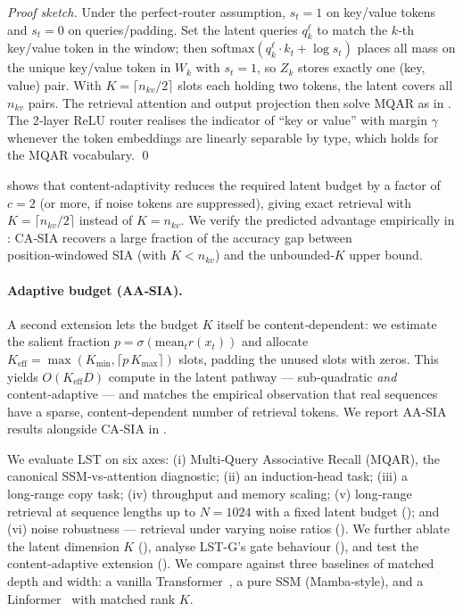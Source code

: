 \documentclass[10pt,twocolumn,letterpaper]{article}
\newcommand{\LST}{\textsc{LST}}
\newcommand{\SIA}{\textsc{SIA}}
\begin{document}
\begin{proof}[Proof sketch]
Under the perfect‑router assumption, $s_t\!=\!1$ on key/value tokens and
$s_t\!=\!0$ on queries/padding.  Set the latent queries $q_k^\ell$ to
match the $k$‑th key/value token in the window; then
$\mathrm{softmax}(q_k^\ell\!\cdot\!k_t + \log s_t)$ places all mass on
the unique key/value token in $W_k$ with $s_t\!=\!1$, so $Z_k$ stores
exactly one (key, value) pair.  With $K\!=\!\lceil n_{kv}/2\rceil$ slots
each holding two tokens, the latent covers all $n_{kv}$ pairs.  The
retrieval attention and output projection then solve MQAR as in
.  The 2‑layer ReLU router realises the indicator of
``key or value'' with margin $\gamma$ whenever the token embeddings are
linearly separable by type, which holds for the MQAR vocabulary.  \qed
\end{proof}

 shows that content‑adaptivity reduces the required
latent budget by a factor of $c\!=\!2$ (or more, if noise tokens are
suppressed), giving exact retrieval with $K\!=\!\lceil n_{kv}/2\rceil$
instead of $K\!=\!n_{kv}$.  We verify the predicted advantage
empirically in : CA‑\SIA{} recovers a large fraction
of the accuracy gap between position‑windowed \SIA{} (with $K\!<\!n_{kv}$)
and the unbounded‑$K$ upper bound.

\paragraph{Adaptive budget (AA‑\SIA{}).}
A second extension lets the budget $K$ itself be content‑dependent: we
estimate the salient fraction $p\!=\!\sigma(\mathrm{mean}_t r(x_t))$ and
allocate $K_{\mathrm{eff}}\!=\!\max(K_{\min}, \lceil p\,K_{\max}\rceil)$
slots, padding the unused slots with zeros.  This yields
$O(K_{\mathrm{eff}}D)$ compute in the latent pathway — sub‑quadratic
\emph{and} content‑adaptive — and matches the empirical observation that
real sequences have a sparse, content‑dependent number of retrieval
tokens.  We report AA‑\SIA{} results alongside CA‑\SIA{} in
.


We evaluate \LST{} on six axes: (i) Multi‑Query Associative Recall (MQAR), the canonical SSM‑vs‑attention diagnostic; (ii) an induction‑head task; (iii) a long‑range copy task; (iv) throughput and memory scaling; (v) long‑range retrieval at sequence lengths up to $N\!=\!1024$ with a fixed latent budget (); and (vi) noise robustness — retrieval under varying noise ratios ().  We further ablate the latent dimension $K$ (), analyse \LST-G{}'s gate behaviour (), and test the content‑adaptive extension ().  We compare against three baselines of matched depth and width: a vanilla Transformer~\cite{vaswani2017attention}, a pure SSM (Mamba‑style), and a Linformer~\cite{wang2020linformer} with matched rank $K$.
\end{document}
